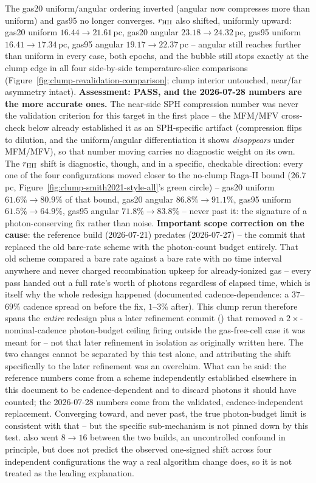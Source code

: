 The gas20 uniform/angular ordering inverted (angular now compresses more
than uniform) and gas95 no longer converges. $r_{\rm HII}$ also shifted,
uniformly upward: gas20 uniform $16.44\to21.61\,$pc, gas20 angular
$23.18\to24.32\,$pc, gas95 uniform $16.41\to17.34\,$pc, gas95 angular
$19.17\to22.37\,$pc -- angular still reaches further than uniform in
every case, both epochs, and the bubble still stops exactly at the
clump edge in all four side-by-side temperature-slice comparisons
(Figure~\ref{fig:clump-revalidation-comparison}; clump interior
untouched, near/far asymmetry intact). \textbf{Assessment: PASS, and the
2026-07-28 numbers are the more accurate ones.} The near-side SPH
compression number was never the validation criterion for this target in
the first place -- the MFM/MFV cross-check below already established it
as an SPH-specific artifact (compression flips to dilution, and the
uniform/angular differentiation it shows \emph{disappears} under
MFM/MFV), so that number moving carries no diagnostic weight on its own.
The $r_{\rm HII}$ shift is diagnostic, though, and in a specific,
checkable direction: every one of the four configurations moved closer
to the no-clump Raga-II bound ($26.7\,$pc,
Figure~\ref{fig:clump-smith2021-style-all}'s green circle) -- gas20
uniform $61.6\%\to80.9\%$ of that bound, gas20 angular
$86.8\%\to91.1\%$, gas95 uniform $61.5\%\to64.9\%$, gas95 angular
$71.8\%\to83.8\%$ -- never past it: the signature of a photon-conserving
fix rather than noise. \textbf{Important scope correction on the cause}:
the  reference build (2026-07-21) predates
 (2026-07-27) -- the commit that replaced the old
bare-rate scheme with the photon-count budget entirely. That old scheme
compared a bare rate against a bare rate with no time interval anywhere
and never charged recombination upkeep for already-ionized gas -- every
pass handed out a full rate's worth of photons regardless of elapsed
time, which is itself why the whole redesign happened (documented
cadence-dependence: a $37$--$69\%$ cadence spread on
 before the fix, $1$--$3\%$ after).
This clump rerun therefore spans the \emph{entire} redesign plus a
later refinement commit () that removed a
$2\times$-nominal-cadence photon-budget ceiling firing outside the
gas-free-cell case it was meant for -- not that later refinement in
isolation as originally written here. The two changes cannot be
separated by this test alone, and attributing the shift specifically to
the later refinement was an overclaim. What can be said: the reference numbers come from a
scheme independently established elsewhere in this document to be
cadence-dependent and to discard photons it should have counted; the
2026-07-28 numbers come from the validated, cadence-independent
replacement. Converging toward, and never past, the true photon-budget
limit is consistent with that -- but the specific sub-mechanism is not
pinned down by this test.  also went $8\to16$ between
the two builds, an uncontrolled confound in principle, but does not
predict the observed one-signed shift across four independent
configurations the way a real algorithm change does, so it is not
treated as the leading explanation.

